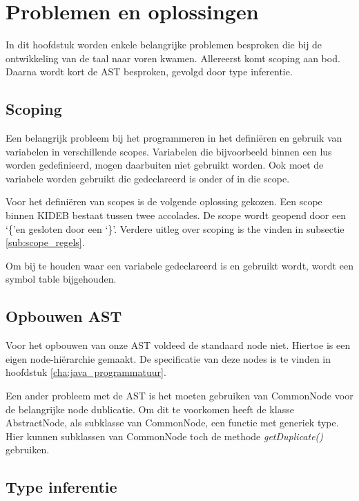 \chapter{Problemen en oplossingen} %
\label{cha:problemen_en_oplossingen}
In dit hoofdstuk worden enkele belangrijke problemen besproken die bij de ontwikkeling van de taal naar voren kwamen. Allereerst komt scoping aan bod. Daarna wordt kort de AST besproken, gevolgd door type inferentie. 
\section{Scoping} %
\label{sec:scoping}
Een belangrijk probleem bij het programmeren in het defini\"eren en gebruik van variabelen in verschillende scopes. Variabelen die bijvoorbeeld binnen een lus worden gedefinieerd, mogen daarbuiten niet gebruikt worden. Ook moet de variabele worden gebruikt die gedeclareerd is onder of in die scope.

Voor het defini\"eren van scopes is de volgende oplossing gekozen. Een scope binnen KIDEB bestaat tussen twee accolades. De scope wordt geopend door een \textquoteleft\{\textquoteright en gesloten door een \textquoteleft\}\textquoteright. Verdere uitleg over scoping is the vinden in subsectie \ref{sub:scope_regels}.

Om bij te houden waar een variabele gedeclareerd is en gebruikt wordt, wordt een symbol table bijgehouden. 

\section{Opbouwen AST} %
\label{sec:opbouwen_ast}
Voor het opbouwen van onze AST voldeed de standaard node niet. Hiertoe is een eigen node-hi\"erarchie gemaakt. De specificatie van deze nodes is te vinden in hoofdstuk \ref{cha:java_programmatuur}.

Een ander probleem met de AST is het moeten gebruiken van CommonNode voor de belangrijke node dublicatie. Om dit te voorkomen heeft de klasse AbstractNode, als subklasse van CommonNode, een functie met generiek type. Hier kunnen subklassen van CommonNode toch de methode \emph{getDuplicate()} gebruiken.

\section{Type inferentie} %
\label{sec:type_inferentie}

